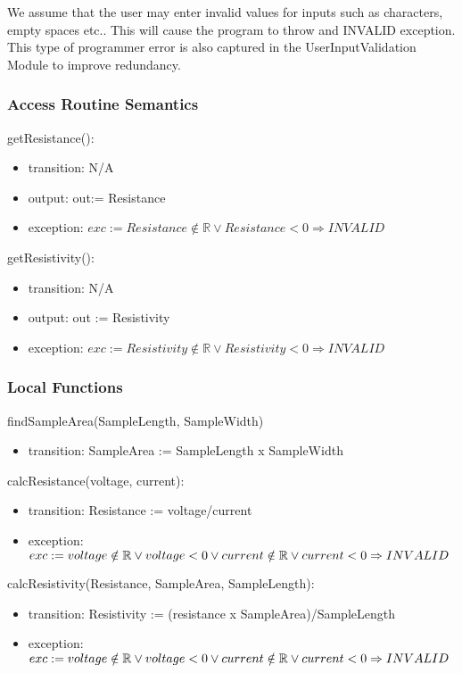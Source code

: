 \documentclass[12pt, titlepage]{article}
\begin{document}
We assume that the user may enter invalid values for inputs such as characters, empty spaces etc..
This will cause the program to throw and INVALID exception. This type of programmer error is also 
captured in the UserInputValidation Module to improve redundancy.

\subsubsection{Access Routine Semantics}

\noindent getResistance():
\begin{itemize}
\item transition: N/A
\item output: out:= Resistance
\item exception: $exc:= Resistance \notin \mathbb{R} \lor Resistance < 0  \Rightarrow INVALID$
\end{itemize}

\noindent getResistivity():
\begin{itemize}
\item transition: N/A
\item output: out := Resistivity
\item exception: $exc:= Resistivity \notin \mathbb{R} \lor Resistivity < 0  \Rightarrow INVALID$
\end{itemize}


\subsubsection{Local Functions}

findSampleArea(SampleLength, SampleWidth)
\begin{itemize}
  \item transition: SampleArea := SampleLength x SampleWidth
  \end{itemize}

  \noindent calcResistance(voltage, current):
  \begin{itemize}
  \item transition: Resistance := voltage/current 
  \item exception: $exc:= \\ 
  voltage \notin \mathbb{R} \lor voltage < 0 \\ 
  \lor current \notin \mathbb{R} \lor current < 0\\
   \Rightarrow INVALID$
  \end{itemize}
  
  \noindent calcResistivity(Resistance, SampleArea, SampleLength):
  \begin{itemize}
  \item transition: Resistivity := (resistance x SampleArea)/SampleLength
  \item exception: $exc:= \\ 
  voltage \notin \mathbb{R} \lor voltage < 0 \\ 
  \lor current \notin \mathbb{R} \lor current < 0\\
   \Rightarrow INVALID$
  \end{itemize}
\newpage
\end{document}
